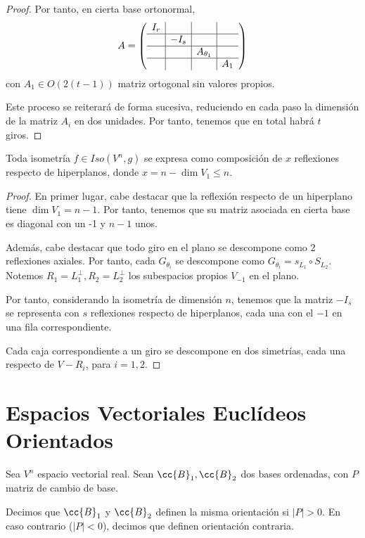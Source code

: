 \begin{proof}
Por tanto, en cierta base ortonormal,
\begin{equation*}
    A= \left(\begin{array}{c|c|c|c}
            I_r &&  \\ \hline
             & -I_s& \\ \hline
             && A_{\theta_1} \\ \hline
             &&& A_1
        \end{array}\right)
\end{equation*}
con $A_1\in O(2(t-1))$ matriz ortogonal sin valores propios.

Este proceso se reiterará de forma sucesiva, reduciendo en cada paso la dimensión de la matriz $A_i$ en dos unidades. Por tanto, tenemos que en total habrá $t$ giros.
\end{proof}


\begin{coro}
    Toda isometría $f\in Iso(V^n,g)$ se expresa como composición de $x$ reflexiones respecto de hiperplanos, donde $x=n-\dim {V_1}\leq n$.
\end{coro}
\begin{proof}

    En primer lugar, cabe destacar que la reflexión respecto de un hiperplano tiene $\dim V_1 = n-1$. Por tanto, tenemos que su matriz asociada en cierta base es diagonal con un -1 y $n-1$ unos.

    Además, cabe destacar que todo giro en el plano se descompone como 2 reflexiones axiales. Por tanto, cada $G_{\theta_i}$ se descompone como $G_{\theta_i}=s_{L_1}\circ S_{L_2}$. Notemos $R_1=L_1^\perp, R_2=L_2^\perp$ los subespacios propios $V_{-1}$ en el plano.
    

    Por tanto, considerando la isometría de dimensión $n$, tenemos que la matriz $-I_s$ se representa con $s$ reflexiones respecto de hiperplanos, cada una con el $-1$ en una fila correspondiente.
    
    
    Cada caja correspondiente a un giro se descompone en dos simetrías, cada una respecto de $V-R_i$, para $i=1,2$.
\end{proof}


\section{Espacios Vectoriales Euclídeos Orientados}

\begin{definicion}
    Sea $V^n$ espacio vectorial real. Sean $\cc{B}_1, \cc{B}_2$ dos bases ordenadas, con $P$ matriz de cambio de base.

    Decimos que $\cc{B}_1$ y $\cc{B}_2$ definen la misma orientación si $|P|>0$. En caso contrario ($|P|<0$), decimos que definen orientación contraria.
\end{definicion}

